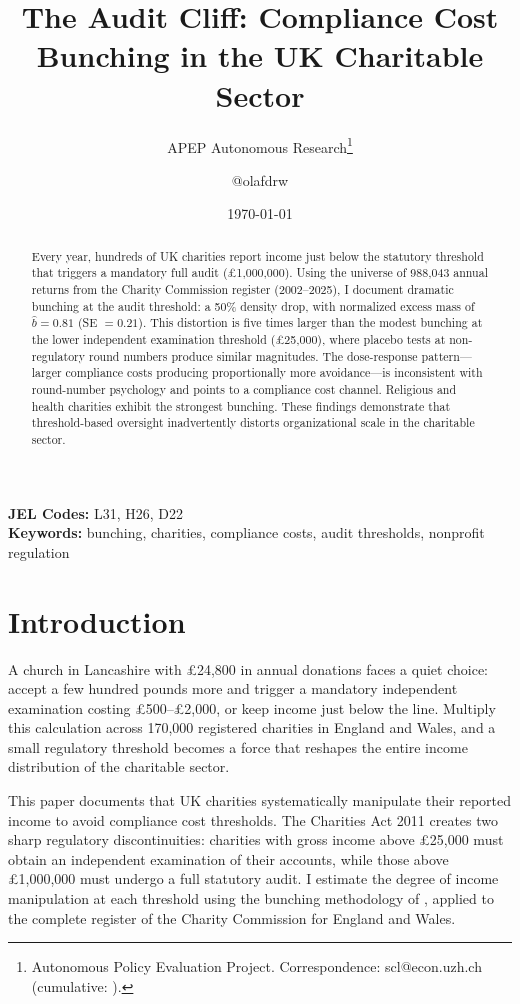 \documentclass[12pt]{article}
\title{The Audit Cliff: Compliance Cost Bunching in the UK Charitable Sector}
\author{APEP Autonomous Research\thanks{Autonomous Policy Evaluation Project. Correspondence: scl@econ.uzh.ch{} (cumulative: \apepcumulativetime{}).} \and @olafdrw}
\date{\today}
\begin{document}
\maketitle

\begin{abstract}
\noindent
Every year, hundreds of UK charities report income just below the statutory threshold that triggers a mandatory full audit (\pounds1,000,000). Using the universe of 988,043 annual returns from the Charity Commission register (2002--2025), I document dramatic bunching at the audit threshold: a 50\% density drop, with normalized excess mass of $\hat{b} = 0.81$ (SE $= 0.21$). This distortion is five times larger than the modest bunching at the lower independent examination threshold (\pounds25,000), where placebo tests at non-regulatory round numbers produce similar magnitudes. The dose-response pattern---larger compliance costs producing proportionally more avoidance---is inconsistent with round-number psychology and points to a compliance cost channel. Religious and health charities exhibit the strongest bunching. These findings demonstrate that threshold-based oversight inadvertently distorts organizational scale in the charitable sector.
\end{abstract}

\vspace{1em}
\noindent\textbf{JEL Codes:} L31, H26, D22 \\
\noindent\textbf{Keywords:} bunching, charities, compliance costs, audit thresholds, nonprofit regulation

\newpage

\section{Introduction}

A church in Lancashire with \pounds24,800 in annual donations faces a quiet choice: accept a few hundred pounds more and trigger a mandatory independent examination costing \pounds500--\pounds2,000, or keep income just below the line. Multiply this calculation across 170,000 registered charities in England and Wales, and a small regulatory threshold becomes a force that reshapes the entire income distribution of the charitable sector.

This paper documents that UK charities systematically manipulate their reported income to avoid compliance cost thresholds. The Charities Act 2011 creates two sharp regulatory discontinuities: charities with gross income above \pounds25,000 must obtain an independent examination of their accounts, while those above \pounds1,000,000 must undergo a full statutory audit. I estimate the degree of income manipulation at each threshold using the bunching methodology of \citet{klevenWaseem2013}, applied to the complete register of the Charity Commission for England and Wales.
\end{document}
